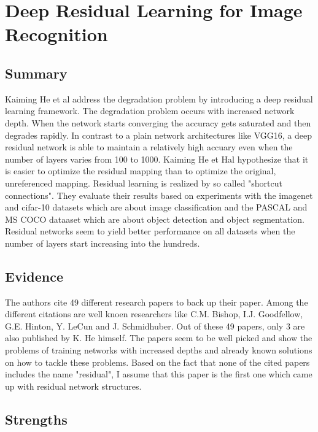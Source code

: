 \documentclass[a4paper]{article}
\begin{document}
\section{Deep Residual Learning for Image Recognition}

\subsection{Summary}

Kaiming He et al address the degradation problem by introducing a deep residual learning framework. The degradation problem occurs with increased network depth. When the network starts converging the accuracy gets saturated and then degrades rapidly. In contrast to a plain network architectures like VGG16, a deep residual network is able to maintain a relatively high accuary even when the number of layers varies from 100 to 1000. Kaiming He et Hal hypothesize that it is easier to optimize the residual mapping than to optimize the original, unreferenced mapping. Residual learning is realized by so called "shortcut connections". They evaluate their results based on experiments with the imagenet and cifar-10 datasets which are about image classification and the PASCAL and MS COCO dataaset which are about object detection and object segmentation. Residual networks seem to yield better performance on all datasets when the number of layers start increasing into the hundreds.

\subsection{Evidence}

The authors cite 49 different research papers to back up their paper. Among the different citations are well knoen researchers like C.M. Bishop, I.J. Goodfellow, G.E. Hinton, Y. LeCun and J. Schmidhuber. Out of these 49 papers, only 3 are also published by K. He himself. The papers seem to be well picked and show the problems of training networks with increased depths and already known solutions on how to tackle these problems. Based on the fact that none of the cited papers includes the name "residual", I assume that this paper is the first one which came up with residual network structures.

\subsection{Strengths}
\end{document}
